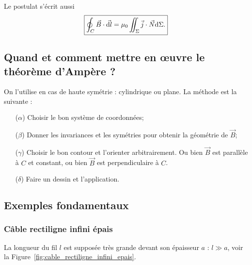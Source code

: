         Le postulat s'écrit aussi
        \begin{equation}
            \boxed{
                \oint_{C}\vec{B}\cdot\vec{\mathrm{d} l}=\mu_{0}\iint_{\Sigma}\vec{j}\cdot\vec{N}\mathrm{d}\Sigma.
            }
        \end{equation}

    \subsection{Quand et comment mettre en œuvre le théorème d'Ampère ?}

        On l'utilise en cas de haute symétrie : cylindrique ou plane. La méthode est la suivante :
        \begin{enumerate}
            \item [($\alpha$)] Choisir le bon système de coordonnées;
            \item [($\beta$)] Donner les invariances et les symétries pour obtenir la géométrie de $\vec{B}$;
            \item [($\gamma$)] Choisir le bon contour et l'orienter arbitrairement. Ou bien $\vec{B}$ est parallèle à $C$ et constant, ou bien $\vec{B}$ est perpendiculaire à $C$.
            \item [($\delta$)] Faire un dessin et l'application.
        \end{enumerate}

    \subsection{Exemples fondamentaux}
        \subsubsection{Câble rectiligne infini épais}

            La longueur du fil $l$ est supposée très grande devant son épaisseur $a$ : $l\gg a$, voir la Figure~\ref{fig:cable_rectiligne_infini_epais}.

